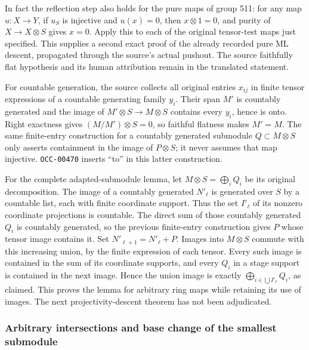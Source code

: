 In fact the reflection step also holds for the pure maps of group 511: for any map \(u:X\to Y\), if \(u_S\) is injective and \(u(x)=0\), then \(x\otimes1=0\), and purity of \(X\to X\otimes S\) gives \(x=0\). Apply this to each of the original tensor-test maps just specified. This supplies a second exact proof of the already recorded pure ML descent, propagated through the source's actual pushout. The source faithfully flat hypothesis and its human attribution remain in the translated statement.

For countable generation, the source collects all original entries \(x_{ij}\) in finite tensor expressions of a countable generating family \(y_i\). Their span \(M'\) is countably generated and the image of \(M'\otimes S\to M\otimes S\) contains every \(y_i\), hence is onto. Right exactness gives \((M/M')\otimes S=0\), so faithful flatness makes \(M'=M\). The same finite-entry construction for a countably generated submodule \(Q\subset M\otimes S\) only asserts containment in the image of \(P\otimes S\); it never assumes that map injective. \texttt{OCC-00470} inserts ``to'' in this latter construction.

For the complete adapted-submodule lemma, let \(M\otimes S=\bigoplus_i Q_i\) be its original decomposition. The image of a countably generated \(N'_\ell\) is generated over \(S\) by a countable list, each with finite coordinate support. Thus the set \(I'_\ell\) of its nonzero coordinate projections is countable. The direct sum of those countably generated \(Q_i\) is countably generated, so the previous finite-entry construction gives \(P\) whose tensor image contains it. Set \(N'_{\ell+1}=N'_\ell+P\). Images into \(M\otimes S\) commute with this increasing union, by the finite expression of each tensor. Every such image is contained in the sum of its coordinate supports, and every \(Q_i\) in a stage support is contained in the next image. Hence the union image is exactly \(\bigoplus_{i\in\bigcup I'_\ell}Q_i\), as claimed. This proves the lemma for arbitrary ring maps while retaining its use of images. The next projectivity-descent theorem has not been adjudicated.

\subsubsection{Arbitrary intersections and base change of the smallest submodule}\label{arbitrary-intersections-and-base-change-of-the-smallest-submodule}

